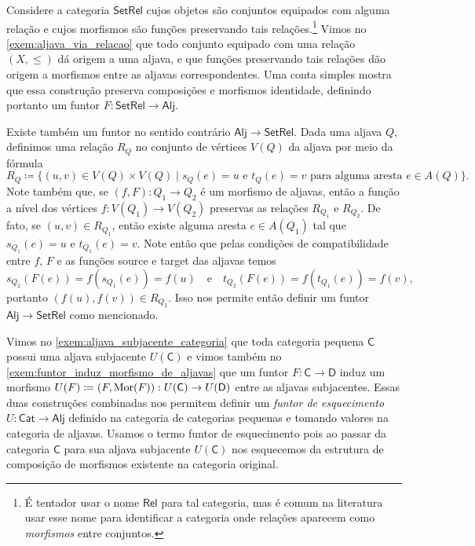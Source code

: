 \begin{exem}
    Considere a categoria $\mathsf{SetRel}$ cujos objetos são conjuntos equipados com alguma relação e cujos morfismos são funções preservando tais relações.\footnote{É tentador usar o nome $\mathsf{Rel}$ para tal categoria, mas é comum na literatura usar esse nome para identificar a categoria onde relações aparecem como \emph{morfismos} entre conjuntos.}
    Vimos no \cref{exem:aljava_via_relacao} que todo conjunto equipado com uma relação $(X,\leq)$ dá origem a uma aljava, e que funções preservando tais relações dão origem a morfismos entre as aljavas correspondentes.
    Uma conta simples mostra que essa construção preserva composições e morfismos identidade, definindo portanto um funtor $F: \mathsf{SetRel} \to \mathsf{Alj}$.
    
    Existe também um funtor no sentido contrário $\mathsf{Alj} \to \mathsf{SetRel}$.
    Dada uma aljava $Q$, definimos uma relação $R_Q$ no conjunto de vértices $V(Q)$ da aljava por meio da fórmula
    \begin{displaymath}
        R_Q \coloneqq \{(u,v) \in V(Q) \times V(Q) \mid s_Q(e) = u \text{ e } t_Q(e) = v \text{ para alguma aresta } e \in A(Q)\}.
    \end{displaymath}
    Note também que, se $(f,F): Q_1 \to Q_2$ é um morfismo de aljavas, então a função a nível dos vértices $f: V(Q_1) \to V(Q_2)$ preservas as relações $R_{Q_1}$ e $R_{Q_2}$.
    De fato, se $(u,v) \in R_{Q_1}$, então existe alguma aresta $e \in A(Q_1)$ tal que $s_{Q_1}(e) = u$ e $t_{Q_1}(e) = v$.
    Note então que pelas condições de compatibilidade entre $f$, $F$ e as funções source e target das aljavas temos
    \begin{displaymath}
        s_{Q_2}(F(e)) = f(s_{Q_1}(e)) = f(u)
        \quad \text{e} \quad
        t_{Q_2}(F(e)) = f(t_{Q_1}(e)) = f(v),
    \end{displaymath}
    portanto $(f(u),f(v)) \in R_{Q_2}$.
    Isso nos permite então definir um funtor $\mathsf{Alj} \to \mathsf{SetRel}$ como mencionado.
\end{exem}

\begin{exem}\label{exem:funtor_esquecimento_cat_aljava}
    Vimos no \cref{exem:aljava_subjacente_categoria} que toda categoria pequena $\mathsf{C}$ possui uma aljava subjacente $U(\mathsf{C})$ e vimos também no \cref{exem:funtor_induz_morfismo_de_aljavas} que um funtor $F: \mathsf{C} \to \mathsf{D}$ induz um morfismo $U(F) \coloneqq (F,\mathrm{Mor}(F)): U(\mathsf{C}) \to U(\mathsf{D})$ entre as aljavas subjacentes.
    Essas duas construções combinadas nos permitem definir um \emph{funtor de esquecimento} $U: \mathsf{Cat} \to \mathsf{Alj}$ definido na categoria de categorias pequenas e tomando valores na categoria de aljavas.
    Usamos o termo funtor de esquecimento pois ao passar da categoria $\mathsf{C}$ para sua aljava subjacente $U(\mathsf{C})$ nos esquecemos da estrutura de composição de morfismos existente na categoria original.
\end{exem}

